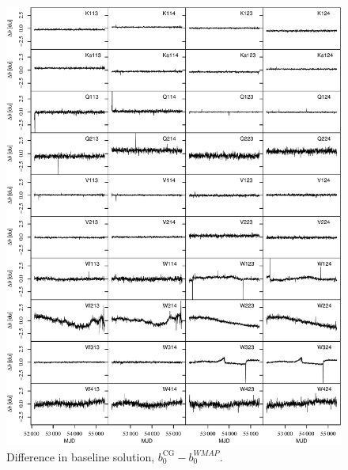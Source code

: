 \documentclass[twocolumn]{../../common/aa}
\begin{document}

\begin{figure}[p]
	\centering
	\includegraphics[width=\textwidth]{figures/instpar_CG_dbaseline_v1.pdf}
	\caption{Difference in baseline solution, $b_0^\mathrm{CG}-b_0^\mathit{WMAP}$.}
	\label{fig:baseline}
\end{figure}
\end{document}
